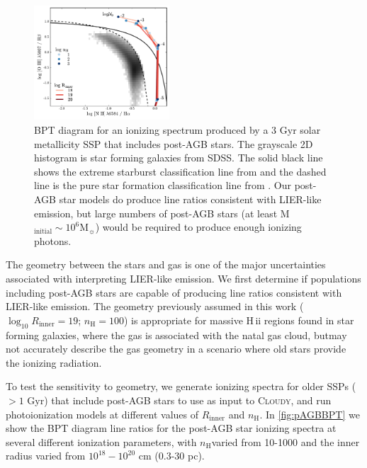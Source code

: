 \documentclass[trackchanges, twocolumn, tighten]{aastex61}
\newcommand{\Fig}[1]{\autoref{fig:#1}}
\newcommand{\Cloudy}{\textsc{Cloudy}\xspace}
\newcommand{\logten}{\ensuremath{\log_{10}}}
\newcommand\Msun{\ensuremath{\mathrm{M_{\sun}}}}
\newcommand{\hii}{H\,{\sc ii}\xspace}
\newcommand{\nH}{\ensuremath{n_{\mathrm{H}}}}
\newcommand{\Rin}{\ensuremath{R_{\mathrm{inner}}}}
\newcommand{\logR}{\ensuremath{\logten R_{\mathrm{inner}}}}
\begin{document}
\begin{figure} [ht]
  \begin{centering}
    \includegraphics[width=0.45\textwidth]{f25.pdf}
    \caption{BPT diagram for an ionizing spectrum produced by a 3 Gyr solar metallicity SSP that includes post-AGB stars. The grayscale 2D histogram is star forming galaxies from SDSS. The solid black line shows the extreme starburst classification line from \citet{Kewley01} and the dashed line is the pure star formation classification line from \citet{Kauffmann03a}. Our post-AGB star models do produce line ratios consistent with LIER-like emission, but large numbers of post-AGB stars (at least M$_{\mathrm{initial}} \sim 10^6\Msun{}$) would be required to produce enough ionizing photons.}
    \label{fig:pAGBBPT}
  \end{centering}
\end{figure}

The geometry between the stars and gas is one of the major uncertainties associated with interpreting LIER-like emission. We first determine if populations including post-AGB stars are capable of producing line ratios consistent with LIER-like emission. The geometry previously assumed in this work ($\logR = 19$; $\nH = 100$) is appropriate for massive \hii regions found in star forming galaxies, where the gas is associated with the natal gas cloud, butmay not accurately describe the gas geometry in a scenario where old stars provide the ionizing radiation.

To test the sensitivity to geometry, we generate ionizing spectra for older SSPs ($>1$ Gyr) that include post-AGB stars to use as input to \Cloudy, and run photoionization models at different values of \Rin{} and \nH{}. In \Fig{pAGBBPT} we show the BPT diagram line ratios for the post-AGB star ionizing spectra at several different ionization parameters, with \nH varied from 10-1000 and the inner radius varied from $10^{18}-10^{20}$ cm (0.3-30 pc). 
\end{document}
